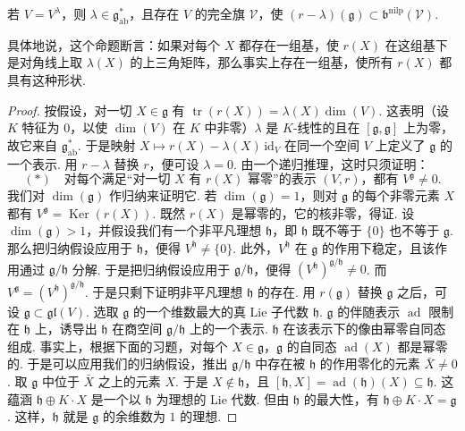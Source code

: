 \begin{numpara}[借助表示论的刻画]
\begin{proposition*}[Engel 定理]
若 $V = V^{\lambda}$，则 $\lambda \in \mathfrak{g}^{*}_{\mathrm{ab}}$，且存在 $V$ 的完全旗 $\mathcal{V}$，使 $(r - \lambda)(\mathfrak{g}) \subset \mathfrak{b}^{\mathrm{nilp}}(\mathcal{V})$.
\end{proposition*}
\begin{remark*}
具体地说，这个命题断言：如果对每个 $X$ 都存在一组基，使 $r(X)$ 在这组基下是对角线上取 $\lambda(X)$ 的上三角矩阵，那么事实上存在一组基，使所有 $r(X)$ 都具有这种形状.
\end{remark*}
\begin{proof}
按假设，对一切 $X \in \mathfrak{g}$ 有 $\operatorname{tr}(r(X)) = \lambda(X)\dim(V)$. 这表明（设 $K$ 特征为 $0$，以使 $\dim(V)$ 在 $K$ 中非零）$\lambda$ 是 $K$-线性的且在 $[\mathfrak{g}, \mathfrak{g}]$ 上为零，故它来自 $\mathfrak{g}^{*}_{\mathrm{ab}}$. 于是映射 $X \longmapsto r(X) - \lambda(X)\,\mathrm{id}_V$ 在同一个空间 $V$ 上定义了 $\mathfrak{g}$ 的一个表示. 用 $r - \lambda$ 替换 $r$，便可设 $\lambda = 0$. 由一个递归推理，这时只须证明：
\[(\ast)\quad\text{对每个满足``对一切 } X \text{ 有 } r(X) \text{ 幂零''的表示 } (V, r)\text{，都有 } V^{\mathfrak{g}} \neq 0.\]
我们对 $\dim(\mathfrak{g})$ 作归纳来证明它. 若 $\dim(\mathfrak{g}) = 1$，则对 $\mathfrak{g}$ 的每个非零元素 $X$ 都有 $V^{\mathfrak{g}} = \operatorname{Ker}(r(X))$. 既然 $r(X)$ 是幂零的，它的核非零，得证.
设 $\dim(\mathfrak{g}) > 1$，并假设我们有一个非平凡理想 $\mathfrak{h}$，即 $\mathfrak{h}$ 既不等于 $\{0\}$ 也不等于 $\mathfrak{g}$. 那么把归纳假设应用于 $\mathfrak{h}$，便得 $V^{\mathfrak{h}} \neq \{0\}$. 此外，$V^{\mathfrak{h}}$ 在 $\mathfrak{g}$ 的作用下稳定，且该作用通过 $\mathfrak{g}/\mathfrak{h}$ 分解. 于是把归纳假设应用于 $\mathfrak{g}/\mathfrak{h}$，便得 $(V^{\mathfrak{h}})^{\mathfrak{g}/\mathfrak{h}} \neq 0$. 而 $V^{\mathfrak{g}} = (V^{\mathfrak{h}})^{\mathfrak{g}/\mathfrak{h}}$.
于是只剩下证明非平凡理想 $\mathfrak{h}$ 的存在. 用 $r(\mathfrak{g})$ 替换 $\mathfrak{g}$ 之后，可设 $\mathfrak{g} \subset \mathfrak{gl}(V)$. 选取 $\mathfrak{g}$ 的一个维数最大的真 Lie 子代数 $\mathfrak{h}$. $\mathfrak{g}$ 的伴随表示 $\operatorname{ad}$ 限制在 $\mathfrak{h}$ 上，诱导出 $\mathfrak{h}$ 在商空间 $\mathfrak{g}/\mathfrak{h}$ 上的一个表示. $\mathfrak{h}$ 在该表示下的像由幂零自同态组成. 事实上，根据下面的习题，对每个 $X \in \mathfrak{g}$，$\mathfrak{g}$ 的自同态 $\operatorname{ad}(X)$ 都是幂零的. 于是可以应用我们的归纳假设，推出 $\mathfrak{g}/\mathfrak{h}$ 中存在被 $\mathfrak{h}$ 的作用零化的元素 $\bar{X} \neq 0$. 取 $\mathfrak{g}$ 中位于 $\bar{X}$ 之上的元素 $X$. 于是 $X \notin \mathfrak{h}$，且 $[\mathfrak{h}, X] = \operatorname{ad}(\mathfrak{h})(X) \subseteq \mathfrak{h}$. 这蕴涵 $\mathfrak{h} \oplus K \cdot X$ 是一个以 $\mathfrak{h}$ 为理想的 Lie 代数. 但由 $\mathfrak{h}$ 的最大性，有 $\mathfrak{h} \oplus K \cdot X = \mathfrak{g}$. 这样，$\mathfrak{h}$ 就是 $\mathfrak{g}$ 的余维数为 $1$ 的理想.

\end{proof}
\end{numpara}
